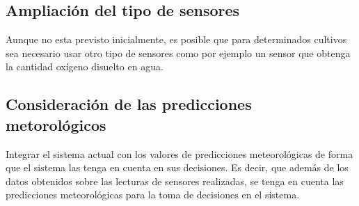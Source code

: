 \documentclass[12pt,a4paper,titlepage,oneside]{report}
\begin{document}
	\subsection*{Ampliación del tipo de sensores}
	Aunque no esta previsto inicialmente, es posible que para determinados cultivos sea necesario usar otro tipo de sensores como por ejemplo un sensor que obtenga la cantidad oxígeno disuelto en agua.

	\subsection*{Consideración de las predicciones metorológicos}
	Integrar el sistema actual con los valores de predicciones meteorológicas de forma que el sistema las tenga en cuenta en sus decisiones. Es decir, que además de los datos obtenidos sobre las lecturas de sensores realizadas, se tenga en cuenta las predicciones meteorológicas para la toma de decisiones en el sistema.


	
\end{document}

